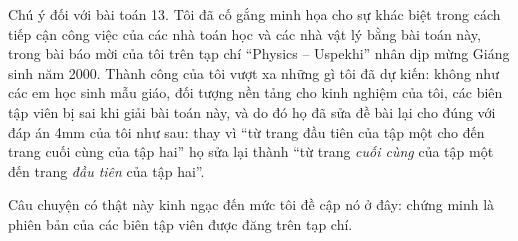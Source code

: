 \begin{note}{Chú ý đối với bài toán 13.}
	Tôi đã cố gắng minh họa cho sự khác biệt trong cách tiếp cận công việc của các nhà toán học và các nhà vật lý bằng bài toán này, trong bài báo mời của tôi trên tạp chí \enquote{Physics -- Uspekhi} nhân dịp mừng Giáng sinh năm 2000. Thành công của tôi vượt xa những gì tôi đã dự kiến:  không như các em học sinh mẫu giáo, đối tượng nền tảng cho kinh nghiệm của tôi,  các biên tập viên bị sai khi giải bài toán này, và do đó họ đã sửa đề bài lại cho đúng với đáp án 4mm của tôi như sau: thay vì \enquote{từ trang đầu tiên của tập một cho đến trang cuối cùng của tập hai}  họ sửa lại thành \enquote{từ trang \emph{cuối cùng} của tập một đến trang \emph{đầu tiên} của tập hai}.

	Câu chuyện có thật này kinh ngạc đến mức tôi  đề cập nó ở đây: chứng minh là phiên bản của các biên tập viên được đăng trên tạp chí.
\end{note}
\clearpage

